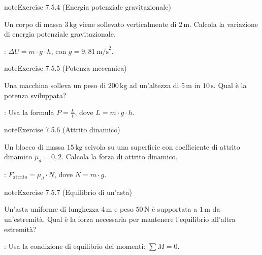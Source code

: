 \documentclass[letterpaper,10pt,italian]{jupyterBook}
\begin{document}
\begin{sphinxadmonition}{note}{Exercise 7.5.4 (Energia potenziale gravitazionale)}



\sphinxAtStartPar
Un corpo di massa \(3 \, \text{kg}\) viene sollevato verticalmente di \(2 \, \text{m}\). Calcola la variazione di energia potenziale gravitazionale.

\sphinxAtStartPar
{}: \( \Delta U = m \cdot g \cdot h \), con \(g = 9,81 \, \text{m/s}^2\).
\end{sphinxadmonition}
 \label{exercise:ch/mechanics/actions-problems-exercise-4}

\begin{sphinxadmonition}{note}{Exercise 7.5.5 (Potenza meccanica)}



\sphinxAtStartPar
Una macchina solleva un peso di \(200 \, \text{kg}\) ad un’altezza di \(5 \, \text{m}\) in \(10 \, \text{s}\). Qual è la potenza sviluppata?

\sphinxAtStartPar
{}: Usa la formula \( P = \frac{L}{t} \), dove \( L = m \cdot g \cdot h \).
\end{sphinxadmonition}
 \label{exercise:ch/mechanics/actions-problems-exercise-5}

\begin{sphinxadmonition}{note}{Exercise 7.5.6 (Attrito dinamico)}



\sphinxAtStartPar
Un blocco di massa \(15 \, \text{kg}\) scivola su una superficie con coefficiente di attrito dinamico \(\mu_d = 0,2\). Calcola la forza di attrito dinamico.

\sphinxAtStartPar
{}: \( F_{\text{attrito}} = \mu_d \cdot N \), dove \(N = m \cdot g\).
\end{sphinxadmonition}
 \label{exercise:ch/mechanics/actions-problems-exercise-6}

\begin{sphinxadmonition}{note}{Exercise 7.5.7 (Equilibrio di un’asta)}



\sphinxAtStartPar
Un’asta uniforme di lunghezza \(4 \, \text{m}\) e peso \(50 \, \text{N}\) è supportata a \(1 \, \text{m}\) da un’estremità. Qual è la forza necessaria per mantenere l’equilibrio all’altra estremità?

\sphinxAtStartPar
{}: Usa la condizione di equilibrio dei momenti: \( \sum M = 0 \).
\end{sphinxadmonition}
 \label{exercise:ch/mechanics/actions-problems-exercise-7}
\end{document}
